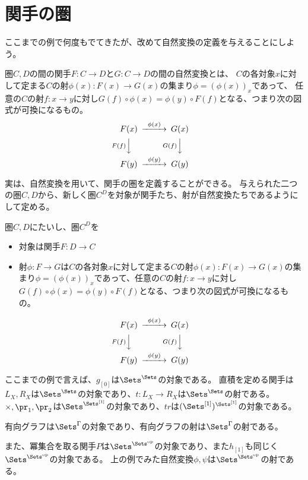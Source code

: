 \documentclass{jsarticle}
\begin{document}
\section{関手の圏}
ここまでの例で何度もでてきたが、改めて自然変換の定義を与えることにしよう。

\begin{dfn}
圏$C, D$の間の関手$F:C \to D$と$G:C \to D$の間の自然変換とは、
$C$の各対象$x$に対して定まる$C$の射$\phi(x):F(x)\to G(x)$の集まり$\phi=(\phi(x))_x$であって、
任意の$C$の射$f:x\to y$に対し$G(f)\circ\phi(x)=\phi(y)\circ F(f)$となる、つまり次の図式が可換になるもの。
\[
\begin{CD}
F(x)@>\phi(x)>>G(x)\\
@VF(f)VV@VG(f)VV\\
F(y)@>\phi(y)>>G(y)
\end{CD}
\]
\end{dfn}

実は、自然変換を用いて、関手の圏を定義することができる。
与えられた二つの圏$C, D$から、新しく圏$C^D$を対象が関手たち、射が自然変換たちであるようにして定める。
\begin{dfn}
圏$C, D$にたいし、圏$C^D$を
\begin{itemize}
\item 対象は関手$F:D\to C$
\item 射$\phi:F\to G$は$C$の各対象$x$に対して定まる$C$の射$\phi(x):F(x)\to G(x)$の集まり$\phi=(\phi(x))_x$であって、任意の$C$の射$f:x\to y$に対し$G(f)\circ\phi(x)=\phi(y)\circ F(f)$となる、つまり次の図式が可換になるもの。
\end{itemize}
\[
\begin{CD}
F(x)@>\phi(x)>>G(x)\\
@VF(f)VV@VG(f)VV\\
F(y)@>\phi(y)>>G(y)
\end{CD}
\]
\end{dfn}

ここまでの例で言えば、$g_{[0]}$は$\Sets^{\Sets}$の対象である。
直積を定める関手は$L_X, R_X$は$\Sets^{\Sets}$の対象であり、$t:L_X \to R_X$は$\Sets^{\Sets}$の射である。
$\times, \pr_1, \pr_2$は$\Sets^{\Sets^{[1]}}$の対象であり、$tr$は$(\Sets^{[1]})^{\Sets^{[1]}}$の対象である。

有向グラフは$\Sets^\Gamma$の対象であり、有向グラフの射は$\Sets^\Gamma$の射である。

また、冪集合を取る関手$P$は$\Sets^{\Sets^{\rm op}}$の対象であり、また$h_{[1]}$も同じく$\Sets^{\Sets^{\rm op}}$の対象である。
上の例でみた自然変換$\phi, \psi$は$\Sets^{\Sets^{\rm op}}$の射である。
\end{document}
